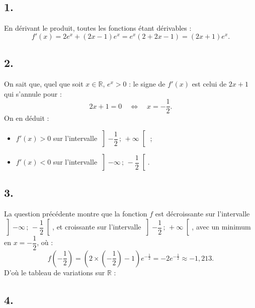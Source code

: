 \subsection*{1.}

En dérivant le produit, toutes les fonctions étant dérivables :
\[
f'(x) = 2 e^x + (2x - 1) e^x = e^x(2 + 2x - 1) = (2x + 1) e^x.
\]

\subsection*{2.}

On sait que, quel que soit \(x \in \mathbb{R}\), \(e^x > 0\) : le signe de \(f'(x)\) est celui de \(2x + 1\) qui s'annule pour :
\[
2x + 1 = 0 \quad \Longleftrightarrow \quad x = -\dfrac{1}{2}.
\]
On en déduit :
\begin{itemize}
    \item \(f'(x) > 0\) sur l'intervalle \(\left]-\dfrac{1}{2}\,;\,+\infty\right[\) ;
    \item \(f'(x) < 0\) sur l'intervalle \(\left]-\infty\,;\,-\dfrac{1}{2}\right[\).
\end{itemize}

\subsection*{3.}

La question précédente montre que la fonction \(f\) est décroissante sur l'intervalle \(\left]-\infty\,;\,-\dfrac{1}{2}\right[\), et croissante sur l'intervalle \(\left]-\dfrac{1}{2}\,;\,+\infty\right[\), avec un minimum en \(x = -\dfrac{1}{2}\), où :
\[
f\left(-\dfrac{1}{2}\right) = \left(2 \times \left(-\dfrac{1}{2}\right) - 1\right) e^{-\frac{1}{2}} = -2 e^{-\frac{1}{2}} \approx -1,213.
\]
D'où le tableau de variations sur \(\mathbb{R}\) :

\begin{center}
\end{center}

\subsection*{4.}

